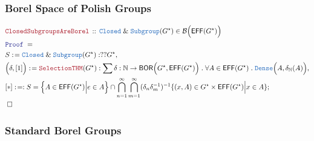 \documentclass[12pt]{scrartcl}
\newcommand{\TYPE}[1]{\textcolor{NavyBlue}{\mathtt{#1}}}
\newcommand{\LOGIC}[1]{\textcolor{Blue}{\mathtt{#1}}}
\newcommand{\THM}[1]{\textcolor{Maroon}{\mathtt{#1}}}
\renewcommand{\.}{\; . \;}
\newcommand{\de}{: \kern 0.1pc =}
\newcommand{\Theorem}[2]{& \THM{#1} \, :: \, #2 \\ & \Proof = \\ }
\newcommand{\Page}[1]{ \begin{align*} #1 \end{align*}   }
\renewcommand{\And}{\; \& \;}
\newcommand{\Nat}{\mathbb{N} }
\newcommand{\Say}[3]{& #1 \de #2 : #3, \\}
\newcommand{\Conclude}[3]{& #1 \de #2 : #3; \\}
\newcommand{\QED}{\; \square}
\newcommand{\EndProof}{& \QED \\}
\newcommand{\Proof}{\LOGIC{Proof} \; }
\newcommand{\B}{\mathcal{B}}
\newcommand{\Dense}{\TYPE{Dense}}
\newcommand{\Closed}{\TYPE{Closed}}
\newcommand{\BOR}{\mathsf{BOR}}
\newcommand{\Effros}{\mathsf{EFF}}
\begin{document}
\subsubsection{Borel Space of Polish Groups}
\Page{
	\Theorem{ClosedSubgroupsAreBorel}
	{
		\Closed \And \TYPE{Subgroup}(G^\star) \in \B\Big( \Effros(G^\star) \Big)
	}
	\Say{S}{\Closed \And \TYPE{Subgroup}(G^\star)}{??G^\star}
	\Say{\Big(\delta,[1]\Big)}
	{
		\THM{SelectionTHM}(G^\star)
	}
	{
		\sum \delta : \Nat \to \BOR\Big(G^\star,\Effros(G^\star)\Big) \.
		\forall A \in \Effros(G^\star) \. \Dense\Big(A, \delta_\Nat(A) \Big)
	}
	\Conclude{[*]}{}
	{
		S =  \Big\{ A \in \Effros(G^\star) \Big| e \in A \Big\}
		\cap \bigcap^\infty_{n=1} \bigcap^\infty_{m=1}
		(\delta_n \delta_m^{-1})^{-1}
		\{
			(x,A) \in G^\star \times \Effros(G^\star) \Big|
			x \in A  
		\}
 	}
 	\EndProof
}
\newpage
\subsubsection{Standard Borel Groups}
\end{document}
